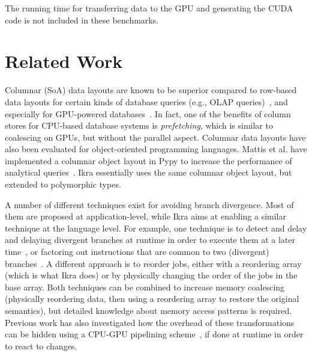 \documentclass[preprint]{sigplanconf}
\begin{document}
The running time for transferring data to the GPU and generating the CUDA code is not included in these benchmarks.

\section{Related Work}
Columnar (SoA) data layouts are known to be superior compared to row-based data layouts for certain kinds of database queries (e.g., OLAP queries)~\cite{Plattner:2009:CDA:1559845.1559846}, and especially for GPU-powered databases~\cite{Bakkum:2010:ASD:1735688.1735706}. In fact, one of the benefits of column stores for CPU-based database systems is \emph{prefetching}, which is similar to coalescing on GPUs, but without the parallel aspect. Columnar data layouts have also been evaluated for object-oriented programming languages. Mattis et al. have implemented a columnar object layout in Pypy to increase the performance of analytical queries~\cite{Mattis:2015:COI:2814228.2814230}. Ikra essentially uses the same columnar object layout, but extended to polymorphic types.

A number of different techniques exist for avoiding branch divergence. Most of them are proposed at application-level, while Ikra aims at enabling a similar technique at the language level. For example, one technique is to detect and delay and delaying divergent branches at runtime in order to execute them at a later time~\cite{88d22b7f17}, or factoring out instructions that are common to two (divergent) branches~\cite{Han:2011:RBD:1964179.1964184}. A different approach is to reorder jobs, either with a reordering array (which is what Ikra does) or by physically changing the order of the jobs in the base array. Both techniques can be combined to increase memory coalescing~\cite{Zhang:2011:OED:1950365.1950408} (physically reordering data, then using a reordering array to restore the original semantics), but detailed knowledge about memory access patterns is required. Previous work has also investigated how the overhead of these transformations can be hidden using a CPU-GPU pipelining scheme~\cite{Zhang:2010:SGA:1810085.1810104}, if done at runtime in order to react to changes.
\end{document}
